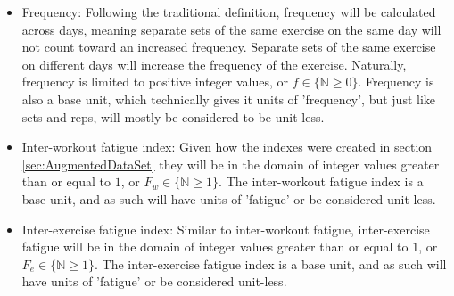 \begin{itemize}
	\item Frequency: Following the traditional definition, frequency will be calculated across days, meaning separate sets of the same exercise on the same day will not count toward an increased frequency. Separate sets of the same exercise on different days will increase the frequency of the exercise. Naturally, frequency is limited to positive integer values, or $f\in \{ \mathbb{N}\ge 0 \}$. Frequency is also a base unit, which technically gives it units of 'frequency', but just like sets and reps, will mostly be considered to be unit-less.
	
	\item Inter-workout fatigue index: Given how the indexes were created in section \ref{sec:AugmentedDataSet} they will be in the domain of integer values greater than or equal to $1$, or $F_w\in \{ \mathbb{N} \ge 1 \}$. The inter-workout fatigue index is a base unit, and as such will have units of 'fatigue' or be considered unit-less.
	
	\item Inter-exercise fatigue index: Similar to inter-workout fatigue, inter-exercise fatigue will be in the domain of integer values greater than or equal to $1$, or $F_e\in \{ \mathbb{N} \ge 1 \}$. The inter-exercise fatigue index is a base unit, and as such will have units of 'fatigue' or be considered unit-less.
\end{itemize}



